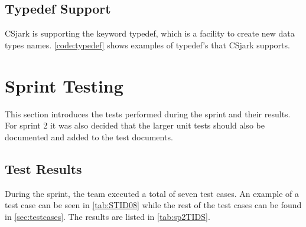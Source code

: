 

\subsection{Typedef Support}
CSjark is supporting the keyword typedef, which is a facility to create new 
data types names. \autoref{code:typedef} shows examples of typedef's that 
CSjark supports.



\section{Sprint Testing}
\label{sec:sp2:test}
This section introduces the tests performed during the sprint and their results. For sprint 2 it was also decided that the larger unit tests should also be documented and added to the test documents.

\subsection{Test Results}
During the sprint, the team executed a total of seven test cases. An example of a test case can be seen in \autoref{tab:STID08} while the rest of the test cases can be found in \autoref{sec:testcases}. The results are listed in \autoref{tab:sp2TIDS}.

